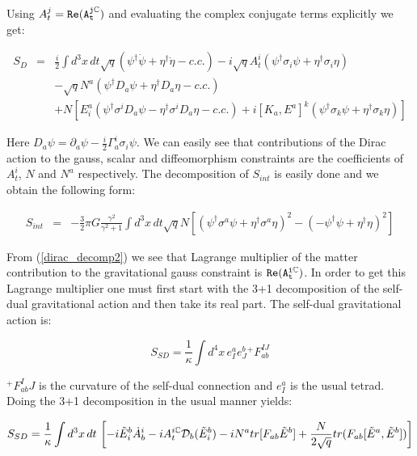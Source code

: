 \begin{doublespace}
Using $A_t^j = \tt{Re}(A_t^{j\mathbb{C}})$ and evaluating the complex conjugate terms explicitly we
get:

\begin{eqnarray}\label{dirac_decomp2}
    S_D & = &  \frac{i}{2}\int d^{3}x\,dt \sqrt{q}(\psi^\dag\dot{\psi} +
    \eta^\dag\dot{\eta} - c.c.) - i\sqrt{q} A_t^{i}(\psi^\dag\sigma_i\psi + \eta^\dag\sigma_i\eta) \nonumber \\
    && - \sqrt{q}N^a(\psi^\dag D_a\psi + \eta^\dag D_a\eta - c.c.) \nonumber \\
    && + N\left[E^a_i(\psi^\dag\sigma^i D_a\psi - \eta^\dag\sigma^i D_a\eta - c.c.)
    + i[K_a,E^a]^k(\psi^\dag\sigma_k\psi + \eta^\dag\sigma_k\eta) \right]
\end{eqnarray}

Here $D_a\psi = \partial_a\psi - \frac{i}{2}\Gamma_a^i\sigma_i\psi$. We can easily see that
contributions of the Dirac action to the gauss, scalar and diffeomorphism constraints are the
coefficients of $A^i_t$, $N$ and $N^a$ respectively. The decomposition of $S_{int}$ is easily done
and we obtain the following form:

\begin{eqnarray}\label{interaction_decomp}
    S_{int} & = &  -\frac{3}{2}\pi G \frac{\gamma^{2}}{\gamma^{2}+1}
                    \int d^{3}x\,dt \sqrt{q}N\left[(\psi^\dag\sigma^a\psi + \eta^\dag\sigma^a\eta)^2 - (-\psi^\dag\psi +
                    \eta^\dag\eta)^2\right]
\end{eqnarray}

From (\ref{dirac_decomp2}) we see that Lagrange multiplier of the matter contribution to the
gravitational gauss constraint is $\tt{Re}(A^{i\mathbb{C}}_t)$. In order to get this Lagrange
multiplier one must first start with the 3+1 decomposition of the self-dual gravitational action
and then take its real part. The self-dual gravitational action is:

\begin{equation}\label{self-dual_action}
    S_{SD} = \frac{1}{\kappa}\int d^4x\,e^a_I e^b_J {}^{+}F_{ab}^{IJ}
\end{equation}

${}^{+}F_{ab}^IJ$ is the curvature of the self-dual connection and $e^a_I$ is the usual tetrad.
Doing the 3+1 decomposition in the usual manner yields:

\begin{equation}\label{self-dual_decomp}
    S_{SD} = \frac{1}{\kappa}\int d^3x\,dt\, \left[-i \tilde{E}^b_i\dot{A}_b^i -
    i A_t^{i\mathbb{C}} {\cal D}_b(\tilde{E}^b_i) - i N^a
    tr[F_{ab}\tilde{E}^b] +
    \frac{N}{2\sqrt{q}}tr(F_{ab}[\tilde{E}^a,\tilde{E}^b])\right]
\end{equation}


\end{doublespace}
